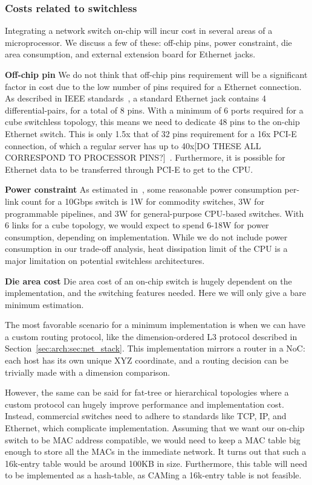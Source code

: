 \subsubsection{Costs related to switchless}
Integrating a network switch on-chip will incur cost in several areas of a microprocessor. We discuss a few of these: off-chip pins, power constraint, die area consumption, and external extension board for Ethernet jacks.

\newcommand{\subsubsubsection}{\textbf}
\subsubsubsection{Off-chip pin}
We do not think that off-chip pins requirement will be a significant factor in cost due to the low number of pins required for a Ethernet connection. As described in IEEE standards~\cite{eithercitation?}, a standard Ethernet jack contains 4 differential-pairs, for a total of 8 pins. With a minimum of 6 ports required for a cube switchless topology, this means we need to dedicate 48 pins to the on-chip Ethernet switch. This is only 1.5x that of 32 pins requirement for a 16x PCI-E connection, of which a regular server has up to 40x[DO THESE ALL CORRESPOND TO PROCESSOR PINS?]~\cite{https://www-ssl.intel.com/content/www/us/en/processors/xeon/xeon-e5-v2-datasheet-vol-1.htmlFIXME}. Furthermore, it is possible for Ethernet data to be transferred through PCI-E to get to the CPU.

\subsubsubsection{Power constraint}
As estimated in~\cite{cheap_silicon}, some reasonable power consumption per-link count for a 10Gbps switch is 1W for commodity switches, 3W for programmable pipelines, and 3W for general-purpose CPU-based switches. With 6 links for a cube topology, we would expect to spend 6-18W for power consumption, depending on implementation. While we do not include power consumption in our trade-off analysis, heat dissipation limit of the CPU is a major limitation on potential switchless architectures.

\subsubsubsection{Die area cost}
Die area cost of an on-chip switch is hugely dependent on the implementation, and the switching features needed. Here we will only give a bare minimum estimation.

The most favorable scenario for a minimum implementation is when we can have a custom routing protocol, like the dimension-ordered L3 protocol described in Section~\ref{sec:arch:sec:net_stack}. This implementation mirrors a router in a NoC: each host has its own unique XYZ coordinate, and a routing decision can be trivially made with a dimension comparison.

However, the same can be said for fat-tree or hierarchical topologies where a custom protocol can hugely improve performance and implementation cost. Instead, commercial switches need to adhere to standards like TCP, IP, and Ethernet, which complicate implementation. Assuming that we want our on-chip switch to be MAC address compatible, we would need to keep a MAC table big enough to store all the MACs in the immediate network. It turns out that such a 16k-entry table would be around 100KB in size. Furthermore, this table will need to be implemented as a hash-table, as CAMing a 16k-entry table is not feasible.


